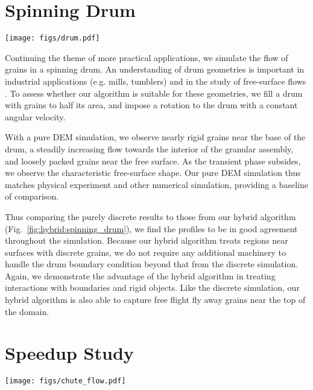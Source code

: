 \section{Spinning Drum}

\begin{center}
  \centering
  \texttt{[image: figs/drum.pdf]}
  \label{fig:hybrid:spinning_drum}
\end{center}

Continuing the theme of more practical applications, we simulate the flow of grains in a spinning drum. An understanding of drum geometries is important in industrial applications (e.g. mills,
tumblers) and in the study of free-surface flows \cite{Midi:2004:Dense}. To assess whether our algorithm is
suitable for these geometries, we fill a drum with grains to half its area, and impose a rotation to the drum with
a constant angular velocity.

With a pure DEM simulation, we observe nearly rigid grains near the base of the drum, a steadily increasing flow towards the interior of the granular assembly, and loosely packed grains near the free surface. As the transient phase subsides, we observe the characteristic free-surface shape. Our pure DEM simulation thus matches physical experiment and other numerical simulation, providing a baseline of comparison.

Thus comparing the purely discrete results to those from our hybrid algorithm (Fig.~\ref{fig:hybrid:spinning_drum}), we find
the profiles to be in good agreement throughout the simulation. Because our hybrid algorithm treats
regions near surfaces with discrete grains, we do not require any additional machinery to handle the drum boundary
condition beyond that from the discrete simulation. Again, we demonstrate the advantage of the hybrid algorithm in treating interactions with boundaries and rigid objects. Like the discrete simulation, our hybrid algorithm is also able to
capture free flight fly away grains near the top of the domain.

\section{Speedup Study}
\begin{center}
  \centering
  \texttt{[image: figs/chute\_flow.pdf]}
  \label{fig:hybrid:chute_flow}
\end{center}

